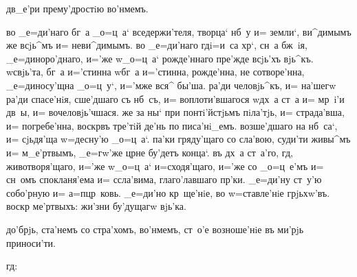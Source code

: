 
 дв_е'ри прему'дростiю во'нмемъ.


 во _е=ди'наго бг~а _о=ц~а` вседержи'теля, 
творца` нб~у и= земли`, ви^димымъ же всjь^мъ и= 
неви^димымъ.  во _е=ди'наго гд i=и~са хр`, сн~а 
бж~iя, _е=диноро'днаго, и='же w\т _о=ц~а` рожде'ннаго 
пре'жде всjь'хъ вjь^къ.  w\т свjь'та, бг~а 
и='стинна w\т бг~а и='стинна, рожде'нна, не сотворе'нна, 
_е=диносу'щна _о=ц~у`, и='мже вся^ бы'ша.  ра'ди 
человjь^къ, и= на'шегw ра'ди спасе'нiя, сше'дшаго съ 
нб~съ, и= воплоти'вшагося w\т дх~а ст~а и= мр~i'и дв~ы, 
и= вочеловjь'чшася.  же за ны` при 
понтi'йстjьмъ пiла'тjь, и= страда'вша, и= погребе'нна,  
воскр въ тре'тiй де'нь по писа'нi_емъ.  
возше'дшаго на нб~са`, и= сjьдя'ща w=десну'ю _о=ц~а`.  
па'ки гряду'щаго со сла'вою, суди'ти живы^мъ и= 
м_е'ртвымъ, _е=гw'же цр не бу'детъ конца`.  въ 
дх~а ст~а'го, гд, животворя'щаго, и='же w\т _о=ц~а` 
и=сходя'щаго, и='же со _о=ц~е'мъ и= сн~омъ спокланя'ема 
и= ссла'вима, глаго'лавшаго пр'ки.  _е=ди'ну ст~у'ю 
собо'рную и= а=п цр~ковь.  _е=ди'но 
кр~ще'нiе, во w=ставле'нiе грjьхw'въ.  воскр 
ме'ртвыхъ:  жи'зни бу'дущагw вjь'ка. 

  до'брjь, ста'немъ со стра'хомъ, 
во'нмемъ, ст~о'е возноше'нiе въ ми'рjь приноси'ти.


                гд: 


